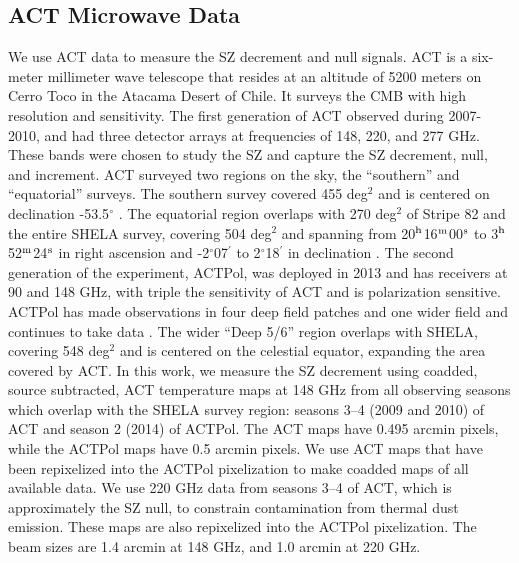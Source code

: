 \documentclass[a4paper,fleqn,usenatbib]{mnras}
\begin{document}
\subsection{ACT Microwave Data}
We use ACT data to measure the SZ decrement and null signals. ACT is a six-meter millimeter wave telescope that resides at an altitude of 5200 meters on Cerro Toco in the Atacama Desert of Chile. It surveys the CMB with high resolution and sensitivity. The first generation of ACT observed during 2007-2010, and had three detector arrays at frequencies of 148, 220, and 277 GHz. These bands were chosen to study the SZ and capture the SZ decrement, null, and increment. ACT surveyed two regions on the sky, the ``southern'' and ``equatorial'' surveys. The southern survey covered 455 deg$^2$ and is centered on declination -53.5$^{\circ}$ \citep{2011ApJ...731..100M}. The equatorial region overlaps with 270 deg$^2$ of Stripe 82 and the entire SHELA survey, covering 504 deg$^2$ and spanning from 20$^{\rm h}$16$^{\rm m}$00$^{\rm s}$ to 3$^{\rm h}$52$^{\rm m}$24$^{\rm s}$ in right ascension and -2$^{\circ}$07$^{\prime}$ to 2$^{\circ}$18$^{\prime}$ in declination \citep{2013JCAP...07..008H}. The second generation of the experiment, ACTPol, was deployed in 2013 and has receivers at 90 and 148 GHz, with triple the sensitivity of ACT and is polarization sensitive. ACTPol has made observations in four deep field patches and one wider field and continues to take data \citep{2014JCAP...10..007N}. The wider ``Deep 5/6'' region overlaps with SHELA, covering 548 deg$^2$ and is centered on the celestial equator, expanding the area covered by ACT.
In this work, we measure the SZ decrement using coadded, source subtracted, ACT temperature maps at 148 GHz from all observing seasons which overlap with the SHELA survey region: seasons 3--4 (2009 and 2010) of ACT and season 2 (2014) of ACTPol. The ACT maps have 0.495 arcmin pixels, while the ACTPol maps have 0.5 arcmin pixels. We use ACT maps that have been repixelized into the ACTPol pixelization to make coadded maps of all available data. %
We use 220 GHz data from seasons 3--4 of ACT, which is approximately the SZ null, to constrain contamination from thermal dust emission. These maps are also repixelized into the ACTPol pixelization. The beam sizes are 1.4 arcmin at 148 GHz, and 1.0 arcmin at 220 GHz.
\end{document}
